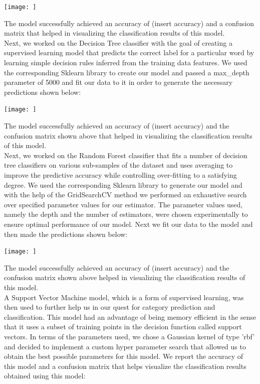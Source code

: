 \documentclass[10pt,twocolumn,letterpaper]{article}
\begin{document}
\begin{center}
\texttt{[image: ]}
\end{center}

The model successfully achieved an accuracy of (insert accuracy) and a confusion matrix that helped in visualizing the classification results of this model.\\ 

Next, we worked on the Decision Tree classifier with the goal of creating a supervised learning model that predicts the correct label for a particular word by learning simple decision rules inferred from the training data features. We used the corresponding Sklearn library to create our model and passed a max\_depth parameter of 5000 and fit our data to it in order to generate the necessary predictions shown below: 

\begin{center}
\texttt{[image: ]}
\end{center}

The model successfully achieved an accuracy of (insert accuracy) and the confusion matrix shown above that helped in visualizing the classification results of this model.\\ 

Next, we worked on the Random Forest classifier that fits a number of decision tree classifiers on various sub-samples of the dataset and uses averaging to improve the predictive accuracy while controlling over-fitting to a satisfying degree. We used the corresponding Sklearn library to generate our model and with the help of the GridSearchCV method we performed an exhaustive search over specified parameter values for our estimator. The parameter values used, namely the depth and the number of estimators, were chosen experimentally to ensure optimal performance of our model. Next we fit our data to the model and then made the predictions shown below:

\begin{center}
\texttt{[image: ]}
\end{center}

The model successfully achieved an accuracy of (insert accuracy) and the confusion matrix shown above helped in visualizing the classification results of this model.\\ 

A Support Vector Machine model, which is a form of supervised learning, was then used to further help us in our quest for category prediction and classification. This model had an advantage of being memory efficient in the sense that it uses a subset of training points in the decision function called support vectors. In terms of the parameters used, we chose a Gaussian kernel of type 'rbf' and decided to implement a custom hyper parameter search that allowed us to obtain the best possible parameters for this model. We report the accuracy of this model and a confusion matrix that helps visualize the classification results obtained using this model: 
\end{document}
